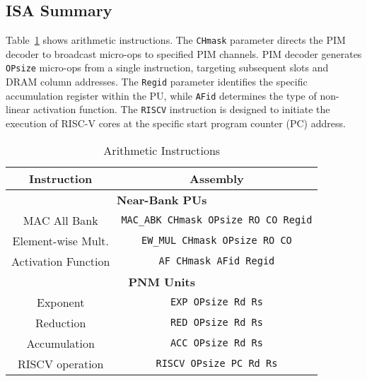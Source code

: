 \subsection{ISA Summary} \label{ISA_Summary}

Table~\ref{tab:ISA_ARITHMETIC} shows \att{} arithmetic instructions. The \texttt{CHmask} parameter directs the PIM decoder to broadcast micro-ops to specified PIM channels.
PIM decoder generates \texttt{OPsize} micro-ops from a single instruction, targeting subsequent \rf{} slots and DRAM column addresses.
The \texttt{Regid} parameter identifies the specific accumulation register within the PU, while \texttt{AFid} determines the type of non-linear activation function.
The \texttt{RISCV} instruction is designed to initiate the execution of RISC-V cores at the specific start program counter (PC) address.

\begin{table}[h]
    \footnotesize
    \centering
    \caption{\att{} Arithmetic Instructions}
    \label{tab:ISA_ARITHMETIC}
    \begin{tabular}{|c||c|}
        \hline
        \textbf{Instruction} & \textbf{Assembly} \\
        \hline
        \hline
        \multicolumn{2}{|c|}{\textbf{Near-Bank PUs}} \\
        \hline
        MAC All Bank & \texttt{MAC\_ABK CHmask OPsize RO CO Regid} \\
        \hline
        Element-wise Mult. & \texttt{EW\_MUL CHmask OPsize RO CO} \\
        \hline
        Activation Function & \texttt{AF CHmask AFid Regid} \\
        \hline
        \hline
        \multicolumn{2}{|c|}{\textbf{PNM Units}} \\
        \hline
        Exponent & \texttt{EXP OPsize Rd Rs} \\
        \hline
        Reduction & \texttt{RED OPsize Rd Rs} \\
        \hline
        Accumulation & \texttt{ACC OPsize Rd Rs} \\
        \hline
        RISCV operation & \texttt{RISCV OPsize PC Rd Rs} \\
        \hline
    \end{tabular}
\end{table}

